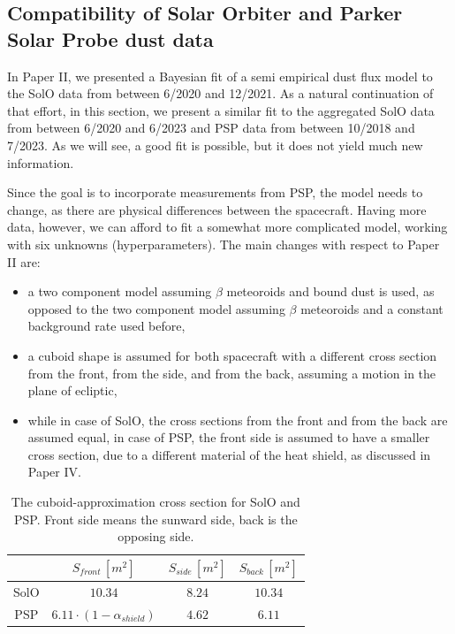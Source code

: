 \subsection{Compatibility of Solar Orbiter and Parker Solar Probe dust data}

In Paper II, we presented a Bayesian fit of a semi empirical dust flux model to the SolO data from between 6/2020 and 12/2021. As a natural continuation of that effort, in this section, we present a similar fit to the aggregated SolO data from between 6/2020 and 6/2023 and PSP data from between 10/2018 and 7/2023. As we will see, a good fit is possible, but it does not yield much new information. 

Since the goal is to incorporate measurements from PSP, the model needs to change, as there are physical differences between the spacecraft. Having more data, however, we can afford to fit a somewhat more complicated model, working with six unknowns (hyperparameters). The main changes with respect to Paper II are:
\begin{itemize}
    \item a two component model assuming $\beta$ meteoroids and bound dust is used, as opposed to the two component model assuming $\beta$ meteoroids and a constant background rate used before,
    \item a cuboid shape is assumed for both spacecraft with a different cross section from the front, from the side, and from the back, assuming a motion in the plane of ecliptic, 
    \item while in case of SolO, the cross sections from the front and from the back are assumed equal, in case of PSP, the front side is assumed to have a smaller cross section, due to a different material of the heat shield, as discussed in Paper IV.
\end{itemize}

\begin{table}[t]
\caption{The cuboid-approximation cross section for SolO and PSP. Front side means the sunward side, back is the opposing side.}
\centering
\label{tab:cross_section}
\begin{tabular}{c|ccc}
\multicolumn{1}{p{1.2cm}}{  } \vline &  
\multicolumn{1}{p{3cm}}{ \centering $S_{front} \, [m^2]$ } & 
\multicolumn{1}{p{2cm}}{ \centering $S_{side} \, [m^2]$} & 
\multicolumn{1}{p{2cm}}{ \centering $S_{back} \, [m^2]$} \\
\hline
SolO & $10.34$ & $8.24$ & $10.34$   \\
PSP & $6.11 \cdot (1-\alpha_{shield})$ & $4.62$ & $6.11$  \\
\hline
\end{tabular}
\end{table}

